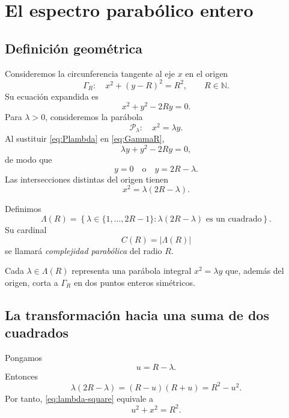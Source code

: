 \documentclass[11pt,a4paper,openany]{report}
\newcommand{\N}{\mathbb{N}}
\newcommand{\Lam}{\Lambda}
\begin{document}
\chapter{El espectro parabólico entero}

\section{Definición geométrica}

Consideremos la circunferencia tangente al eje \(x\) en el origen
\begin{equation}
 \Gamma_R:\quad x^2+(y-R)^2=R^2,
 \qquad R\in\N.
 \label{eq:GammaR}
\end{equation}
Su ecuación expandida es
\[
 x^2+y^2-2Ry=0.
\]
Para \(\lambda>0\), consideremos la parábola
\begin{equation}
 \mathcal P_\lambda:\quad x^2=\lambda y.
 \label{eq:Plambda}
\end{equation}
Al sustituir \eqref{eq:Plambda} en \eqref{eq:GammaR},
\[
 \lambda y+y^2-2Ry=0,
\]
de modo que
\[
 y=0\quad\text{o}\quad y=2R-\lambda.
\]
Las intersecciones distintas del origen tienen
\begin{equation}
 x^2=\lambda(2R-\lambda).
 \label{eq:lambda-square}
\end{equation}

\begin{definition}
Definimos
\begin{equation}
 \boxed{
 \Lam(R)=\left\{\lambda\in\{1,\ldots,2R-1\}:\lambda(2R-\lambda)\text{ es un cuadrado}\right\}.}
 \label{eq:spectrum}
\end{equation}
Su cardinal
\[
 C(R)=|\Lam(R)|
\]
se llamará \emph{complejidad parabólica} del radio \(R\).
\end{definition}

Cada \(\lambda\in\Lam(R)\) representa una parábola integral \(x^2=\lambda y\) que, además del origen, corta a \(\Gamma_R\) en dos puntos enteros simétricos.

\section{La transformación hacia una suma de dos cuadrados}

Pongamos
\[
 u=R-\lambda.
\]
Entonces
\[
 \lambda(2R-\lambda)=(R-u)(R+u)=R^2-u^2.
\]
Por tanto, \eqref{eq:lambda-square} equivale a
\begin{equation}
 u^2+x^2=R^2.
 \label{eq:lattice-circle}
\end{equation}
\end{document}
